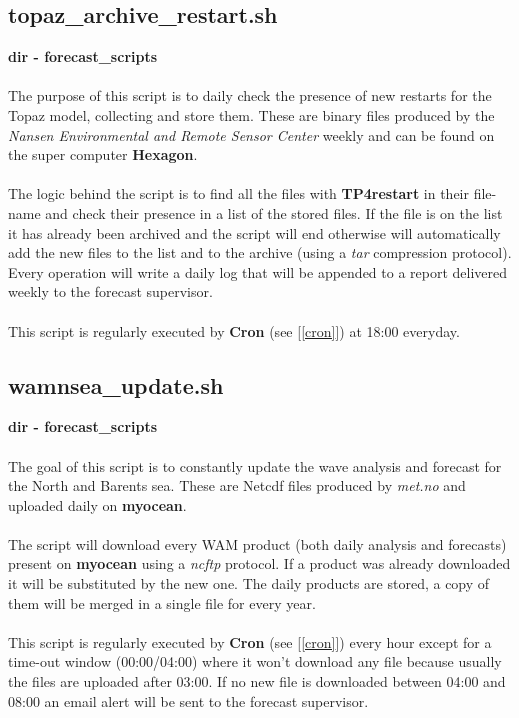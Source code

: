 \documentclass[12pt,a4paper]{report}
\begin{document}
\subsection{topaz\_archive\_restart.sh}
\label{tparchv}
\textbf{dir - forecast\_scripts}
\\ \\
The purpose of this script is to daily check the presence of new restarts for the Topaz model, collecting and store them. These are binary files produced by the \textit{Nansen Environmental and Remote Sensor Center} weekly and can be found on the super computer \textbf{Hexagon}.
\\ \\
The logic behind the script is to find all the files with \textbf{TP4restart} in their file-name and check their presence in a list of the stored files. If the file is on the list it has already been archived and the script will end otherwise will automatically add the new files to the list and to the archive (using a \textit{tar} compression protocol). Every operation will write a daily log that will be appended to a report delivered weekly to the forecast supervisor.
\\ \\
This script is regularly executed by \textbf{Cron} (see [\ref{cron}]) at 18:00 everyday.

\subsection{wamnsea\_update.sh}
\label{wamnseaupdate}
\textbf{dir - forecast\_scripts}
\\ \\
The goal of this script is to constantly update the wave analysis and forecast for the North and Barents sea. These are Netcdf files produced by \textit{met.no} and uploaded daily on \textbf{myocean}. 
\\ \\
The script will download every WAM product (both daily analysis and forecasts) present on \textbf{myocean} using a \textit{ncftp} protocol. If a product was already downloaded it will be substituted by the new one. The daily products are stored, a copy of them will be merged in a single file for every year.
\\ \\
This script is regularly executed by \textbf{Cron} (see [\ref{cron}]) every hour except for a time-out window (00:00/04:00) where it won't download any file because usually the files are uploaded after 03:00. If no new file is downloaded between 04:00 and 08:00 an email alert will be sent to the forecast supervisor.
\end{document}
